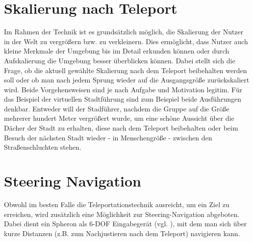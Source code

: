 \section{Skalierung nach Teleport}
Im Rahmen der Technik ist es grundsätzlich möglich, die Skalierung der Nutzer in der Welt zu vergrößern bzw. zu verkleinern. Dies ermöglicht, dass Nutzer auch kleine Merkmale der Umgebung bis im Detail erkunden können oder durch Aufskalierung die Umgebung besser überblicken können. Dabei stellt sich die Frage, ob die aktuell gewählte Skalierung nach dem Teleport beibehalten werden soll oder ob man nach jedem Sprung wieder auf die Ausgangsgröße zurückskaliert wird. Beide Vorgehensweisen sind je nach Aufgabe und Motivation legitim. Für das Beispiel der virtuellen Stadtführung sind zum Beispiel beide Ausführungen denkbar. Entweder will der Stadführer, nachdem die Gruppe auf die Größe mehrerer hundert Meter vergrößert wurde, um eine schöne Aussicht über die Dächer der Stadt zu erhalten, diese nach dem Teleport beibehalten oder beim Besuch der nächsten Stadt wieder - in Menschengröße - zwischen den Straßenschluchten stehen.

\section{Steering Navigation}
Obwohl im besten Falle die Teleportationstechnik ausreicht, um ein Ziel zu erreichen, wird zusätzlich eine Möglichkeit zur Steering-Navigation abgeboten. Dabei dient ein Spheron als 6-DOF Eingabegerät (vgl. \cite{Kulik2011C1x6}), mit dem man sich über kurze Distanzen (z.B. zum Nachjustieren nach dem Teleport) navigieren kann.

